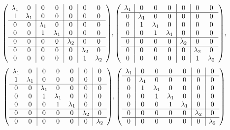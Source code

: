 \documentclass{scrreprt}
\begin{document}
\[
  \qty(\begin{array}{cc|cc|c|cc}
    \lambda_1 & 0 & 0 & 0 & 0 & 0 & 0 \\
    1 & \lambda_1 & 0 & 0 & 0 & 0 & 0 \\
    \hline
    0 & 0 & \lambda_1 & 0 & 0 & 0 & 0 \\
    0 & 0 & 1 & \lambda_1 & 0 & 0 & 0 \\
    \hline
    0 & 0 & 0 & 0 & \lambda_2 & 0 & 0 \\
    \hline
    0 & 0 & 0 & 0 & 0 & \lambda_2 & 0 \\
    0 & 0 & 0 & 0 & 0 & 1 & \lambda_2 \\
  \end{array}), \qty(\begin{array}{c|ccc|c|cc}
    \lambda_1 & 0 & 0 & 0 & 0 & 0 & 0 \\
    \hline
    0 & \lambda_1 & 0 & 0 & 0 & 0 & 0 \\
    0 & 1 & \lambda_1 & 0 & 0 & 0 & 0 \\
    0 & 0 & 1 & \lambda_1 & 0 & 0 & 0 \\
    \hline
    0 & 0 & 0 & 0 & \lambda_2 & 0 & 0 \\
    \hline
    0 & 0 & 0 & 0 & 0 & \lambda_2 & 0 \\
    0 & 0 & 0 & 0 & 0 & 1 & \lambda_2 \\
  \end{array}),
\]
\[
  \qty(\begin{array}{cc|ccc|c|c}
    \lambda_1 & 0 & 0 & 0 & 0 & 0 & 0 \\
    1 & \lambda_1 & 0 & 0 & 0 & 0 & 0 \\
    \hline
    0 & 0 & \lambda_1 & 0 & 0 & 0 & 0 \\
    0 & 0 & 1 & \lambda_1 & 0 & 0 & 0 \\
    0 & 0 & 0 & 1 & \lambda_1 & 0 & 0 \\
    \hline
    0 & 0 & 0 & 0 & 0 & \lambda_2 & 0 \\
    \hline
    0 & 0 & 0 & 0 & 0 & 0 & \lambda_2 \\
  \end{array}), \qty(\begin{array}{c|cccc|c|c}
    \lambda_1 & 0 & 0 & 0 & 0 & 0 & 0 \\
    \hline
    0 & \lambda_1 & 0 & 0 & 0 & 0 & 0 \\
    0 & 1 & \lambda_1 & 0 & 0 & 0 & 0 \\
    0 & 0 & 1 & \lambda_1 & 0 & 0 & 0 \\
    0 & 0 & 0 & 1 & \lambda_1 & 0 & 0 \\
    \hline
    0 & 0 & 0 & 0 & 0 & \lambda_2 & 0 \\
    \hline
    0 & 0 & 0 & 0 & 0 & 0 & \lambda_2 \\
  \end{array})
\]
\end{document}

